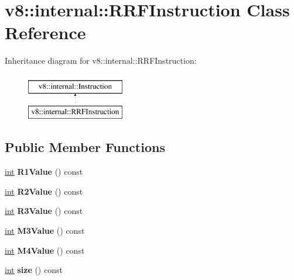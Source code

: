 \hypertarget{classv8_1_1internal_1_1RRFInstruction}{}\section{v8\+:\+:internal\+:\+:R\+R\+F\+Instruction Class Reference}
\label{classv8_1_1internal_1_1RRFInstruction}
Inheritance diagram for v8\+:\+:internal\+:\+:R\+R\+F\+Instruction\+:\begin{figure}[H]
\begin{center}
\leavevmode
\includegraphics[height=2.000000cm]{classv8_1_1internal_1_1RRFInstruction}
\end{center}
\end{figure}
\subsection*{Public Member Functions}
\begin{DoxyCompactItemize}
\item 
\mbox{\label{classv8_1_1internal_1_1RRFInstruction_ad13db206147e5aec8de3a6ce1b78cb78}} 
\mbox{\hyperlink{classint}{int}} {\bfseries R1\+Value} () const
\item 
\mbox{\label{classv8_1_1internal_1_1RRFInstruction_a4f6a1ec3e3687066e4d240b6be51dea5}} 
\mbox{\hyperlink{classint}{int}} {\bfseries R2\+Value} () const
\item 
\mbox{\label{classv8_1_1internal_1_1RRFInstruction_abe1a2ed22938c4545ec636598ee38fd2}} 
\mbox{\hyperlink{classint}{int}} {\bfseries R3\+Value} () const
\item 
\mbox{\label{classv8_1_1internal_1_1RRFInstruction_ae52e2c39190d5894f8d64060a03fb43e}} 
\mbox{\hyperlink{classint}{int}} {\bfseries M3\+Value} () const
\item 
\mbox{\label{classv8_1_1internal_1_1RRFInstruction_a7543c1cfa0698b4afe32ea2aea8713c6}} 
\mbox{\hyperlink{classint}{int}} {\bfseries M4\+Value} () const
\item 
\mbox{\label{classv8_1_1internal_1_1RRFInstruction_a7146b3ad8ff7ea510d20097166f69be5}} 
\mbox{\hyperlink{classint}{int}} {\bfseries size} () const
\end{DoxyCompactItemize}


